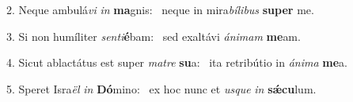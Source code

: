 2. Neque ambulá\textit{vi} \textit{in} \textbf{ma}gnis: \ast\  neque in mira\textit{bí}\textit{li}\textit{bus} \textbf{su}\textbf{per} me.\

3. Si non humíliter \textit{sen}\textit{ti}\textbf{é}bam: \ast\  sed exaltávi \textit{á}\textit{ni}\textit{mam} \textbf{me}am.\

4. Sicut ablactátus est super \textit{ma}\textit{tre} \textbf{su}a: \ast\  ita retribútio in \textit{á}\textit{ni}\textit{ma} \textbf{me}a.\

5. Speret Isra\textit{ël} \textit{in} \textbf{Dó}mino: \ast\  ex hoc nunc et \textit{us}\textit{que} \textit{in} \textbf{sǽ}\textbf{cu}lum.\


